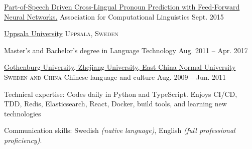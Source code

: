 \documentclass[10pt,a4paper]{article}
\begin{document}
\vspace{1em}

\spacedhrule{-0.2em}{-0.4em}


\headedsection  %
  {\href{http://aclweb.org/anthology/W15-2508}{Part-of-Speech Driven Cross-Lingual Pronoun Prediction with Feed-Forward Neural Networks.}}
  {\textsc{}} {%
  \headedsubsection
    {Association for Computational Linguistics}
    {Sept. 2015}
    {}}


\vspace{1em}

\spacedhrule{-0.2em}{-0.4em}



\headedsection
  {\href{http://www.uu.se/en/}{Uppsala University}}
  {\textsc{Uppsala, Sweden}} {%

  \headedsubsection
    {Master's and Bachelor's degree in Language Technology}
    {Aug. 2011 -- Apr. 2017}
    {}

}

\headedsection
  {\href{http://gu.se/english/}{Gothenburg University, Zhejiang University, East China Normal University}}
  {\textsc{Sweden and China}} {%
  \headedsubsection
    {Chinese language and culture}
    {Aug. 2009 -- Jun. 2011} {}
}

\spacedhrule{0.5em}{-0.4em}


\inlineheadsection  %
  {Technical expertise:}
  {Codes daily in Python and TypeScript. Enjoys CI/CD, TDD, Redis, Elasticsearch, React, Docker, build tools, and learning new technologies}

\vspace{0.5em}
\inlineheadsection
  {Communication skills:}
  {Swedish \emph{(native language)}, English \emph{(full professional proficiency)}.}
\end{document}
